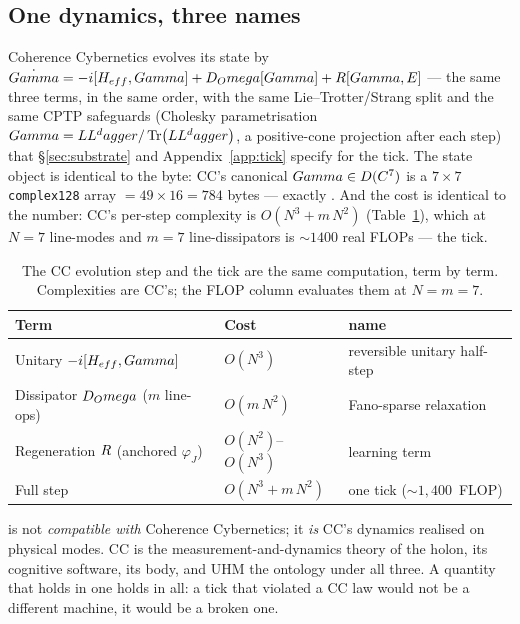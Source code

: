 \subsection{One dynamics, three names}
\label{subsec:one-dynamics}

Coherence Cybernetics evolves its state by
$\dot{Gamma} = -i[H_{eff},Gamma] + D_Omega[Gamma] + R[Gamma,E]$ --- the same
three terms, in the same order, with the same Lie--Trotter/Strang split and the
same CPTP safeguards (Cholesky parametrisation $Gamma = LL^dagger/\Tr(LL^dagger)$,
a positive-cone projection after each step) that \S\ref{sec:substrate} and
Appendix~\ref{app:tick} specify for the tick. The state object is identical to
the byte: CC's canonical $Gamma\in D(C^7)$ is a $7\times7$
\texttt{complex128} array $=49\times16=784$ bytes --- exactly \DM{}. And the cost
is identical to the number: CC's per-step complexity is
$O(N^3 + m\,N^2)$ (Table~\ref{tab:cc-cost}), which at $N=7$ line-modes and $m=7$
line-dissipators is ${\sim}1400$ real FLOPs --- the \TALOS{} tick.

\begin{table}[H]
\centering\small
\caption{The CC evolution step and the \TALOS{} tick are the same computation,
term by term. Complexities are CC's; the FLOP column evaluates them at $N=m=7$.}
\label{tab:cc-cost}
\begin{tabular}{@{}p{4.6cm}p{3.4cm}p{3.4cm}@{}}
\toprule
\textbf{Term} & \textbf{Cost} & \textbf{\TALOS{} name} \\
\midrule
Unitary $-i[H_{eff},Gamma]$ & $O(N^3)$ & reversible unitary half-step \\
Dissipator $D_Omega$ ($m$ line-ops) & $O(m\,N^2)$ & Fano-sparse relaxation \\
Regeneration $R$ (anchored $\varphi_J$) & $O(N^2)$--$O(N^3)$ & learning term \\
\midrule
Full step & $O(N^3+m\,N^2)$ & one tick (${\sim}1{,}400$~FLOP) \\
\bottomrule
\end{tabular}
\end{table}

\begin{principle}\label{prin:cc-identity}
\TALOS{} is not \emph{compatible with} Coherence Cybernetics; it \emph{is} CC's
dynamics realised on physical modes. CC is the measurement-and-dynamics theory of
the holon, \SYNARC{} its cognitive software, \TALOS{} its body, and UHM the
ontology under all three. A quantity that holds in one holds in all: a tick that
violated a CC law would not be a different machine, it would be a broken one.
\end{principle}

